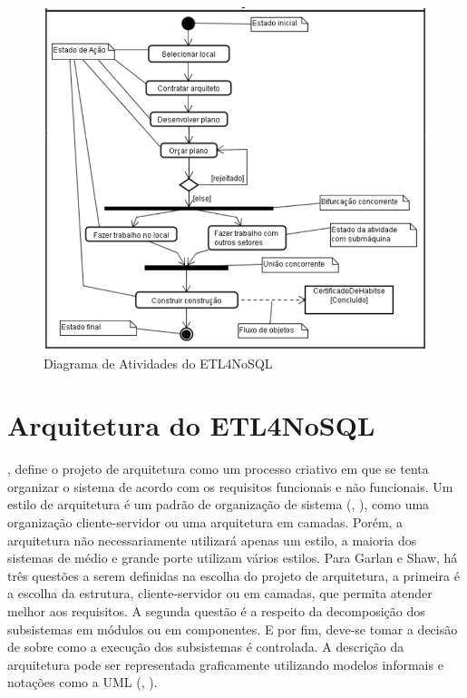 \begin{figure}[h!]
	\centering
	\includegraphics[scale=0.9]{fig/diagrama_atividades.png}
	\caption{Diagrama de Atividades do ETL4NoSQL}
	\label{diagramaatividades}
\end{figure}



\section{Arquitetura do ETL4NoSQL}


\cite{sommerville:2013}, define o projeto de arquitetura como um processo criativo em que se tenta organizar o sistema de acordo com os requisitos funcionais e não funcionais. Um estilo de arquitetura é um padrão de organização de sistema (\cite{shaw:1996}, \cite{sommerville:2013}), como uma organização cliente-servidor ou uma arquitetura em camadas. Porém, a arquitetura não necessariamente utilizará apenas um estilo, a maioria dos sistemas de médio e grande porte utilizam vários estilos. Para Garlan e Shaw, há três questões a serem definidas na escolha do projeto de arquitetura, a primeira é a escolha da estrutura, cliente-servidor ou em camadas, que permita atender melhor aos requisitos. A segunda questão é a respeito da decomposição dos subsistemas em módulos ou em componentes. E por fim, deve-se tomar a decisão de sobre como a execução dos subsistemas é controlada. A descrição da arquitetura pode ser representada graficamente utilizando modelos informais e notações como a UML (\cite{clements:2002}, \cite{sommerville:2013}).

